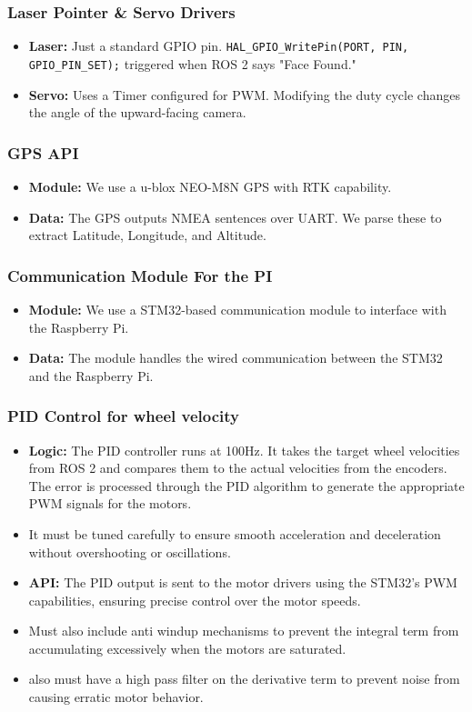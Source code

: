 \documentclass[12pt, a4paper]{article}
\begin{document}
\subsubsection{Laser Pointer \& Servo Drivers}
\begin{itemize}
    \item \textbf{Laser:} Just a standard GPIO pin. \texttt{HAL\_GPIO\_WritePin(PORT, PIN, GPIO\_PIN\_SET);} triggered when ROS 2 says "Face Found."
    \item \textbf{Servo:} Uses a Timer configured for PWM. Modifying the duty cycle changes the angle of the upward-facing camera.
\end{itemize}

\subsubsection{ GPS API}
\begin{itemize}
    \item \textbf{Module:} We use a u-blox NEO-M8N GPS with RTK capability.
    \item \textbf{Data:} The GPS outputs NMEA sentences over UART. We parse these to extract Latitude, Longitude, and Altitude.
\end{itemize}

\subsubsection{Communication Module For the PI}
\begin{itemize}
    \item \textbf{Module:} We use a STM32-based communication module to interface with the Raspberry Pi.
    \item \textbf{Data:} The module handles the wired communication between the STM32 and the Raspberry Pi.
\end{itemize}

\subsubsection{PID Control for wheel velocity}
\begin{itemize}
    \item \textbf{Logic:} The PID controller runs at 100Hz. It takes the target wheel velocities from ROS 2 and compares them to the actual velocities from the encoders. The error is processed through the PID algorithm to generate the appropriate PWM signals for the motors.
    \item It must be tuned carefully to ensure smooth acceleration and deceleration without overshooting or oscillations.
    \item \textbf{API:} The PID output is sent to the motor drivers using the STM32's PWM capabilities, ensuring precise control over the motor speeds.
    \item Must also include anti windup mechanisms to prevent the integral term from accumulating excessively when the motors are saturated.
    \item also must have a high pass filter on the derivative term to prevent noise from causing erratic motor behavior.
\end{itemize}
\end{document}

